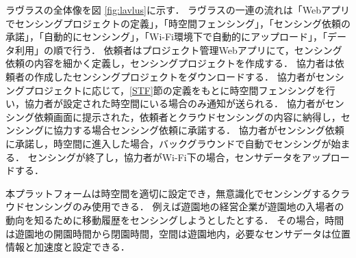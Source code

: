 ラヴラスの全体像を図 \ref{fig:lavlus}に示す．
ラヴラスの一連の流れは「Webアプリでセンシングプロジェクトの定義」，「時空間フェンシング」，「センシング依頼の承諾」，「自動的にセンシング」，「Wi-Fi環境下で自動的にアップロード」，「データ利用」の順で行う．
依頼者はプロジェクト管理Webアプリにて，センシング依頼の内容を細かく定義し，センシングプロジェクトを作成する．
協力者は依頼者の作成したセンシングプロジェクトをダウンロードする．
協力者がセンシングプロジェクトに応じて，\ref{STF}節の定義をもとに時空間フェンシングを行い，協力者が設定された時空間にいる場合のみ通知が送られる．
協力者がセンシング依頼画面に提示された，依頼者とクラウドセンシングの内容に納得し，センシングに協力する場合センシング依頼に承諾する．
協力者がセンシング依頼に承諾し，時空間に進入した場合，バックグラウンドで自動でセンシングが始まる．
センシングが終了し，協力者がWi-Fi下の場合，センサデータをアップロードする．

本プラットフォームは時空間を適切に設定でき，無意識化でセンシングするクラウドセンシングのみ使用できる．
例えば遊園地の経営企業が遊園地の入場者の動向を知るために移動履歴をセンシングしようとしたとする．
その場合，時間は遊園地の開園時間から閉園時間，空間は遊園地内，必要なセンサデータは位置情報と加速度と設定できる．




